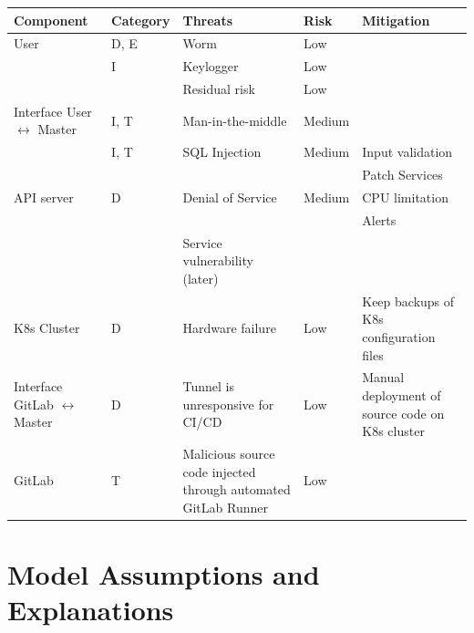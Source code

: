 \begin{tabular*}{\textwidth}{p{2.1cm} p{1.8cm} p{3cm} p{2cm} p{3.5cm}}
    \textbf{Component} & \textbf{Category} & \textbf{Threats} & \textbf{Risk} & \textbf{Mitigation} \\
    \hline
    User                & D, E & Worm & Low & \\
                        & I & Keylogger & Low & \\
                        & & Residual risk & Low & \\
    \hline
    Interface User \(\leftrightarrow\) Master   & I, T & Man-in-the-middle & Medium & \\
                            & I, T & SQL Injection & Medium & Input validation \\
                            & & & & Patch Services \\
    \hline
    API server          & D & Denial of Service & Medium & CPU limitation \\
                        & & & & Alerts \\
                        & & Service vulnerability (later) & & \\
    \hline
    K8s Cluster             & D & Hardware failure & Low & Keep backups of K8s configuration files \\
    \hline
    Interface GitLab \(\leftrightarrow\) Master & D & Tunnel is unresponsive for CI/CD & Low & Manual deployment of source code on K8s cluster \\
    \hline
    GitLab             & T & Malicious source code injected through automated GitLab Runner & Low & \\ 
    \hline
\end{tabular*}


\section{Model Assumptions and Explanations}

